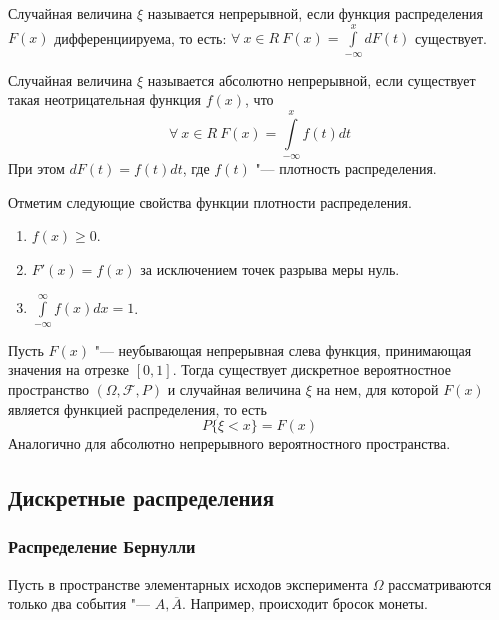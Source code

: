 \begin{definition}
    Случайная величина $\xi$ называется непрерывной,
    если функция распределения $F(x)$ дифференциируема, то есть:
    $\forall ~ x \in R ~ F(x) = \int\limits_{-\infty}^x dF(t)$ существует.
\end{definition}

\begin{definition}
    Случайная величина $\xi$ называется абсолютно непрерывной, если
    существует такая неотрицательная функция $f(x)$, что
    \begin{equation*}
        \forall ~ x \in R ~ F(x) = \int\limits_{-\infty}^x f(t)dt
    \end{equation*}
    При этом $dF(t) = f(t)dt$, где $f(t)$ "--- плотность распределения.
\end{definition}

\begin{theorem}
    Отметим следующие свойства функции плотности распределения.
    \begin{enumerate}
        \item $f(x) \geq 0$.
        \item $F'(x) = f(x)$ за исключением точек разрыва меры нуль.
        \item $\int\limits_{-\infty}^{\infty}f(x)dx = 1$.
    \end{enumerate}
\end{theorem}

\begin{theorem}
    Пусть $F(x)$ "--- неубывающая непрерывная слева функция,
    принимающая значения на отрезке $[0, 1]$. Тогда
    существует дискретное вероятностное пространство $(\Omega, \mathcal{F}, P)$
    и случайная величина $\xi$ на нем, для которой $F(x)$ является
    функцией распределения, то есть 
    \begin{equation*}
    P\{\xi < x\} = F(x)
    \end{equation*}
    Аналогично для абсолютно непрерывного вероятностного пространства.
\end{theorem}

\subsection{Дискретные распределения}
\subsubsection{Распределение Бернулли}
Пусть в пространстве элементарных исходов
эксперимента $\Omega$ рассматриваются только
два события "--- $A, \overline{A}$. Например,
происходит бросок монеты. 

